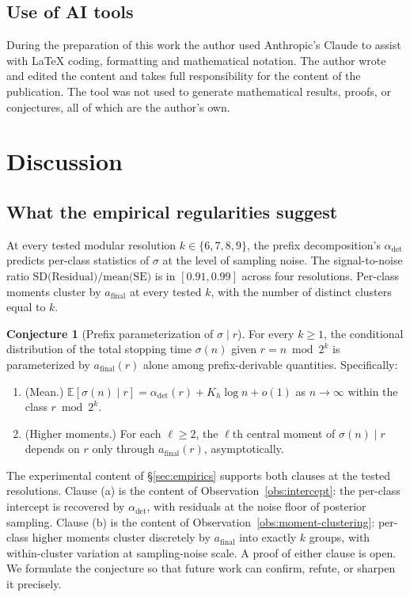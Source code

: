 \documentclass[pdflatex,sn-mathphys-num]{sn-jnl}
\theoremstyle{thmstyleone}%
\theoremstyle{definition}
\newtheorem{conjecture}[theorem]{Conjecture}
\theoremstyle{plain}
\begin{document}
\subsection{Use of AI tools}
During the preparation of this work the author used Anthropic's Claude to assist with LaTeX coding, formatting and mathematical notation. The author wrote and edited the content and takes full responsibility for the content of the publication. The tool was not used to generate mathematical results, proofs, or conjectures, all of which are the author's own.

\section{Discussion}
\label{sec:discussion}
\subsection{What the empirical regularities suggest}
At every tested modular resolution $k \in \{6, 7, 8, 9\}$, the prefix decomposition's $\alpha_{\text{det}}$ predicts per-class statistics of $\sigma$ at the level of sampling noise. The signal-to-noise ratio $\text{SD(Residual)}/ \text{mean(SE)}$ is in $[0.91, 0.99]$ across four resolutions. Per-class moments cluster by $a_{\text{final}}$ at every tested $k$, with the number of distinct clusters equal to $k$.

\begin{conjecture}[Prefix parameterization of $\sigma \mid r$]
\label{conj:prefix-parameterization}
For every $k \geq 1$, the conditional distribution of the total stopping time $\sigma(n)$ given $r = n \bmod 2^k$ is parameterized by $a_{\text{final}}(r)$ alone among prefix-derivable quantities. Specifically:
\begin{enumerate}
    \item[(a)] (Mean.) $\mathbb{E}[\sigma(n) \mid r] = \alpha_{\text{det}}(r) + K_h \log n + o(1)$ as $n \to \infty$ within the class $r \bmod 2^k$.
    \item[(b)] (Higher moments.) For each $\ell \geq 2$, the $\ell$th central moment of $\sigma(n) \mid r$ depends on $r$ only through $a_{\text{final}}(r)$, asymptotically.
\end{enumerate}
\end{conjecture}

The experimental content of \S\ref{sec:empirics} supports both clauses at the tested resolutions. Clause (a) is the content of Observation~\ref{obs:intercept}: the per-class intercept is recovered by $\alpha_{\text{det}}$, with residuals at the noise floor of posterior sampling. Clause (b) is the content of Observation~\ref{obs:moment-clustering}: per-class higher moments cluster discretely by $a_{\text{final}}$ into exactly $k$ groups, with within-cluster variation at sampling-noise scale. A proof of either clause is open. We formulate the conjecture so that future work can confirm, refute, or sharpen it precisely.
\end{document}
